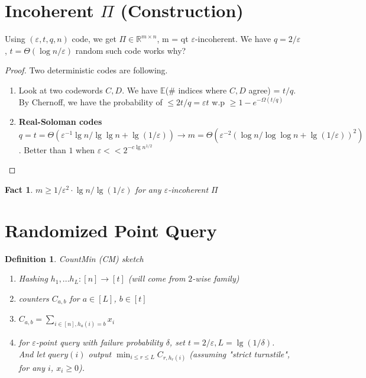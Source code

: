 \documentclass[11pt]{article}
\newtheorem{definition}[theorem]{Definition}
\newtheorem{fact}[theorem]{Fact}
\begin{document}
\section{Incoherent $\Pi$ (Construction)}
Using $(\varepsilon, t, q, n)$ code, we get $\Pi\in\mathbb{R}^{m\times n}$, m = qt $\varepsilon$-incoherent. We have $q=2/\varepsilon$, $t=\Theta(\log n/\varepsilon)$ random such code works why?
\begin{proof}
Two deterministic codes are following.
\begin{enumerate}
\item Look at two codewords $C, D$. We have $\mathbb{E}$($\#$ indices where $C, D$ agree) = $t/q$. By Chernoff, we have the probability of $\leq2t/q = \varepsilon t$ w.p $\geq 1- e^{-\Omega(t/q)}$
\item {\bf Real-Soloman codes}\\
$q=t=\Theta(\varepsilon^{-1}\lg n/\lg\lg n+\lg(1/\varepsilon))\rightarrow m = \Theta(\varepsilon^{-2}(\log n/\log\log n+\lg(1/\varepsilon))^2)$. Better than $1$ when $\varepsilon<< 2^{-c\lg n^{1/2}}$
\end{enumerate}
\end{proof}
\begin{fact}
$m\geq 1/\varepsilon^2\cdot \lg n/\lg(1/\varepsilon)$ for any $\varepsilon$-incoherent $\Pi$ 
\end{fact}

\section{Randomized Point Query}
\begin{definition}
CountMin (CM) sketch \cite{Graham}
\begin{enumerate}
\item Hashing $h_1,...h_L: [n]\rightarrow[t]$ (will come from $2$-wise family)
\item counters $C_{a,b}$ for $a\in [L]$, $b\in [t]$
\item $C_{a,b}=\sum_{i\in[n], h_a(i)=b}x_i$
\item for $\varepsilon$-point query with failure probability $\delta$, set $t=2/\varepsilon, L = \lg(1/\delta)$.\\ And let $query(i)$ output $\min_{i\leq r\leq L} C_{r, h_r(i)}$ (assuming "strict turnstile", for any $i$, $x_i\geq 0$). 
\end{enumerate}
\end{definition}
\end{document}
